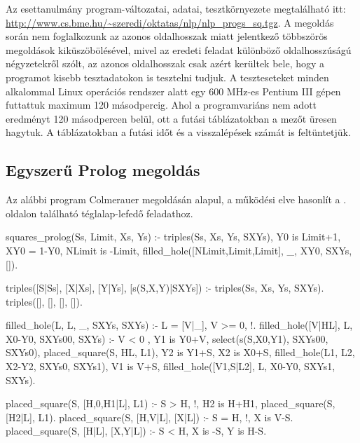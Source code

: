 Az esettanulmány program-változatai, adatai, tesztkörnyezete
megtalálható itt: \url{http://www.cs.bme.hu/~szeredi/oktatas/nlp/nlp_progs_sq.tgz}.
\br
A megoldás során nem foglalkozunk az azonos oldalhosszak miatt jelentkező többszörös
megoldások kiküszöbölésével, mivel az eredeti feladat különböző oldalhosszúságú négyzetekről
szólt, az azonos oldalhosszak csak azért kerültek bele, hogy a programot kisebb
tesztadatokon is tesztelni tudjuk. A teszteseteket minden alkalommal Linux operációs
rendszer alatt egy 600 MHz-es Pentium III gépen futtattuk maximum 120 másodpercig. Ahol
a programvariáns nem adott eredményt 120 másodpercen belül, ott a futási táblázatokban
a mezőt üresen hagytuk. A táblázatokban a futási időt és a visszalépések számát
is feltüntetjük.

\subsection{Egyszerű Prolog megoldás}

Az alábbi program Colmerauer \clpr megoldásán alapul, a működési elve hasonlít a
\pageref{teglalap:clpqr}. oldalon található téglalap-lefedő feladathoz.

\begin{prologcode}
squares_prolog(Ss, Limit, Xs, Ys) :-
        triples(Ss, Xs, Ys, SXYs),
        Y0 is Limit+1,
        XY0 = 1-Y0,
        NLimit is -Limit,
        filled_hole([NLimit,Limit,Limit], _, XY0, SXYs, []).

triples([S|Ss], [X|Xs], [Y|Ys], [s(S,X,Y)|SXYs]) :-
        triples(Ss, Xs, Ys, SXYs).
triples([], [], [], []).

filled_hole(L, L, _, SXYs, SXYs) :-
        L = [V|_], V >= 0, !.
filled_hole([V|HL], L, X0-Y0, SXYs00, SXYs) :-
        V < 0 , Y1 is Y0+V,
        select(s(S,X0,Y1), SXYs00, SXYs0),
        placed_square(S, HL, L1),
        Y2 is Y1+S, X2 is X0+S,
        filled_hole(L1, L2, X2-Y2, SXYs0, SXYs1),
        V1 is V+S,
        filled_hole([V1,S|L2], L, X0-Y0, SXYs1, SXYs).

placed_square(S, [H,0,H1|L], L1) :-
        S > H, !, H2 is H+H1,
        placed_square(S, [H2|L], L1).
placed_square(S, [H,V|L], [X|L]) :-
        S = H, !, X is V-S.
placed_square(S, [H|L], [X,Y|L]) :-
        S < H, X is -S, Y is H-S.
\end{prologcode}

